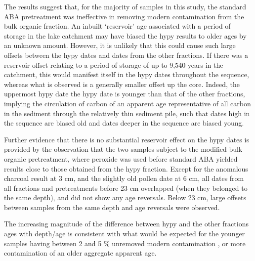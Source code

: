\documentclass[
  12pt,
]{book}
\begin{document}
The results suggest that, for the majority of samples in this study, the standard ABA pretreatment was ineffective in removing modern contamination from the bulk organic fraction. An inbuilt `reservoir' age associated with a period of storage in the lake catchment may have biased the hypy results to older ages by an unknown amount. However, it is unlikely that this could cause such large offsets between the hypy dates and dates from the other fractions. If there was a reservoir offset relating to a period of storage of up to 9,540 years in the catchment, this would manifest itself in the hypy dates throughout the sequence, whereas what is observed is a generally smaller offset up the core. Indeed, the uppermost hypy date the hypy date is younger than that of the other fractions, implying the circulation of carbon of an apparent age representative of all carbon in the sediment through the relatively thin sediment pile, such that dates high in the sequence are biased old and dates deeper in the sequence are biased young.

Further evidence that there is no substantial reservoir effect on the hypy dates is provided by the observation that the two samples subject to the modified bulk organic pretreatment, where peroxide was used before standard ABA yielded results close to those obtained from the hypy fraction. Except for the anomalous charcoal result at 3 cm, and the slightly old pollen date at 6 cm, all dates from all fractions and pretreatments before 23 cm overlapped (when they belonged to the same depth), and did not show any age reversals. Below 23 cm, large offsets between samples from the same depth and age reversals were observed.

The increasing magnitude of the difference between hypy and the other fractions ages with depth/age is consistent with what would be expected for the younger samples having between 2 and 5 \% unremoved modern contamination \citep{woodRevolutionConventionPresent2015}, or more contamination of an older aggregate apparent age.
\end{document}
